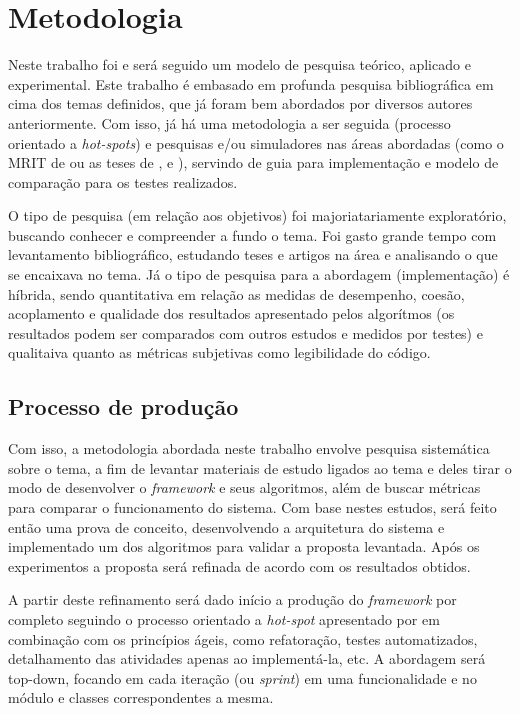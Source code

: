 \chapter[Metodologia]{Metodologia}

Neste trabalho foi e será seguido um modelo de pesquisa teórico, aplicado e experimental. Este trabalho é embasado em profunda pesquisa bibliográfica em cima dos temas definidos, que já foram bem abordados por diversos autores anteriormente. Com isso, já há uma metodologia a ser seguida (processo orientado a \textit{hot-spots}) e pesquisas e/ou simuladores nas áreas abordadas (como o MRIT de \cite{Guzman2008} ou as teses de \cite{Souza2008}, \cite{Thomsen2010} e \cite{Strandberg2004}), servindo de guia para implementação e modelo de comparação para os testes realizados.

O tipo de pesquisa (em relação aos objetivos) foi majoriatariamente exploratório, buscando conhecer e compreender a fundo o tema. Foi gasto grande tempo com levantamento bibliográfico, estudando teses e artigos na área e analisando o que se encaixava no tema. Já o tipo de pesquisa para a abordagem (implementação) é híbrida, sendo quantitativa em relação as medidas de desempenho, coesão, acoplamento e qualidade dos resultados apresentado pelos algorítmos (os resultados podem ser comparados com outros estudos e medidos por testes) e qualitaiva quanto as métricas subjetivas como legibilidade do código.

\section{Processo de produção}

Com isso, a metodologia abordada neste trabalho envolve pesquisa sistemática sobre o tema, a fim de levantar materiais de estudo ligados ao tema e deles tirar o modo de desenvolver o \textit{framework} e seus algoritmos, além de buscar métricas para comparar o funcionamento do sistema. Com base nestes estudos, será feito então uma prova de conceito, desenvolvendo a arquitetura do sistema e implementado um dos algoritmos para validar a proposta levantada. Após os experimentos a proposta será refinada de acordo com os resultados obtidos.

A partir deste refinamento será dado início a produção do \textit{framework} por completo seguindo o processo orientado a \textit{hot-spot} apresentado por \cite{Fayad1999} em combinação com os princípios ágeis, como refatoração, testes automatizados, detalhamento das atividades apenas ao implementá-la, etc. A abordagem será top-down, focando em cada iteração (ou \textit{sprint}) em uma funcionalidade e no módulo e classes correspondentes a mesma. 

